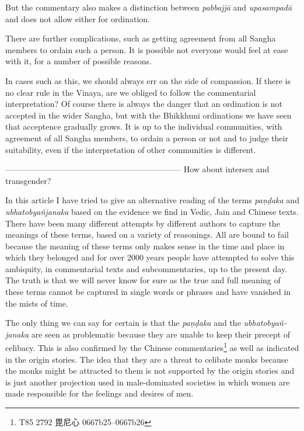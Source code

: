 But the commentary also makes a distinction between {\em pabbajjā} and {\em upasampadā} and does not allow either for ordination.



There are further complications, such as getting agreement from all Sangha members to ordain such a person. It is possible not everyone would feel at ease with it, for a number of possible reasons.

In cases such as this, we should always err on the side of compassion. If there is no clear rule in the Vinaya, are we obliged to follow the commentarial interpretation? Of course there is always the danger that an ordination is not accepted in the wider Sangha, but with the Bhikkhuni ordinations we have seen that acceptence gradually grows. It is up to the individual communities, with agreement of all Sangha members, to ordain a person or not and to judge their suitability, even if the interpretation of other communities is different. 

-----------------------------------------------------------------
How about intersex and transgender?


In this article I have tried to give an alternative reading of the terms {\em paṇḍaka} and {\em ubhatob­yañ­janaka} based on the evidence we find in Vedic, Jain and Chinese texts. There have been many different attempts by different authors to capture the meanings of these terms, based on a variety of reasonings. All are bound to fail because the meaning of these terms only makes sense in the time and place in which they belonged and for over 2000 years people have attempted to solve this ambiquity, in commentarial texts and subcommentaries, up to the present day. The truth is that we will never know for sure as the true and full meaning of these terms cannot be captured in single words or phrases and have vanished in the mists of time. 

The only thing we can say for certain is that the {\em paṇḍaka} and the {\em ubhatob­yañ­janaka} are seen as problematic because they are unable to keep their precept of celibacy. This is also confirmed by the Chinese commentaries\footnote{T85 2792 毘尼心 0667b25–0667b26} as well as indicated in the origin stories. The idea that they are a threat to celibate monks because the monks might be attracted to them is not supported by the origin stories and is just another projection used in male-dominated societies in which women are made responsible for the feelings and desires of men. 

